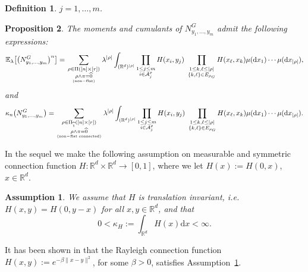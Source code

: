 \documentclass[12pt]{article}
\newtheorem{assumption}{Assumption}[section]
\newcommand{\R}{\mathbb{R}}
\newcommand{\E}{\mathbb{E}}
\newtheorem{prop}{Proposition}[section]
\newtheorem{definition}[prop]{Definition}
\def\real{{\mathord{\mathbb R}}}
\numberwithin{equation}{section}
\begin{document}
{\begin{definition}
  $j=1,\ldots , m$.
   \end{definition}
   \begin{prop}
    \label{mom-cumfor}
     The moments and cumulants of $N_{y_1,\ldots , y_m}^G$ admit
     the following expressions: 
    $$
      \E_\lambda \big[\big(N_{y_1,\ldots , y_m}^G\big)^n\big]=
      \sum_{\substack{\rho\in\Pi ([n]\times[r])
          \\\rho\wedge\pi=\widehat{0}} \atop {\rm (non-flat)}}
      \lambda^{|\rho |}
      \int_{(\R^d)^{|\rho|}}\prod_{\substack{ %
          1 \leq j \leq m
          \\ i\in {\cal A}^\rho_j}}
        H(x_i,y_j)
        \ \prod_{
          \substack{1 \leq k , \ell \le|\rho|
            \\
            \{ k , \ell \}\in E_{\rho_G} 
        }}H(x_\ell,x_k)\mu ( \mathrm{d}x_1 ) \cdots \mu ( \mathrm{d}x_{|\rho|}),
        $$
        and
        \begin{equation}
          \label{cumulant-diagram1}
        \kappa_n\big(N_{y_1,\ldots , y_m}^G\big)=
        \sum_{\substack{\rho\in\Pi_{\widehat{1}} ([n]\times[r])
            \\\rho\wedge\pi=\widehat{0}} \atop {\rm (non-flat \ \! connected)}}
      \lambda^{|\rho |}
      \int_{(\R^d)^{|\rho|}}\prod_{
        \substack{%
        1 \leq j \leq m
          \\
        i\in {\cal A}^\rho_j}}  H(x_i,y_j)
      \ \prod_{\substack{
          1\leq k , \ell \le|\rho|
          \\
          \{ k , \ell \}\in E_{\rho_G} }}H(x_\ell,x_k)\mu ( \mathrm{d}x_1)
      \cdots \mu ( \mathrm{d}x_{|\rho|} ).
    \end{equation} 
    \end{prop}
}
In the sequel we make the following assumption on measurable and symmetric 
 connection function $H:\R^d\times\R^d\to[0,1]$,
  where we let $H(x):=H(0,x)$, $x\in \real^d$. 
 \begin{assumption}
  \label{measurability1} 
 We assume that $H$ is translation invariant, i.e. $H(x,y)=H(0,y-x)$ for all $x,y\in\R^d$, and that 
\begin{equation}
  \label{integrability-1}
0<\kappa_H:=\int_{\R^d}H(x)\mathrm{d}x<\infty.
\end{equation}
\end{assumption}
It has been shown in \cite{LiuPrivault23} that the Rayleigh connection function $H(x,y):=e^{-\beta\|x-y\|^2}$, for some $\beta>0$, satisfies Assumption~\ref{measurability1}. 
\end{document}
